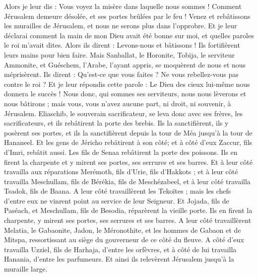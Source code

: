 \begin{multicols}{2}
Alors je leur dis : Vous voyez la misère dans laquelle nous sommes ! Comment Jérusalem demeure désolée, et ses portes brûlées par le feu ! Venez et rebâtissons les murailles de Jérusalem, et nous ne serons plus dans l’opprobre.
Et je leur déclarai comment la main de mon Dieu avait été bonne sur moi, et quelles paroles le roi m'avait dites. Alors ils dirent : Levons-nous et bâtissons ! Ils fortifièrent leurs mains pour bien faire.
Mais Sanballat, le Horonite, Tobija, le serviteur Ammonite, et Guéschem, l’Arabe, l'ayant appris, se moquèrent de nous et nous méprisèrent. Ils dirent : Qu'est-ce que vous faites ? Ne vous rebellez-vous pas contre le roi ?
Et je leur répondis cette parole : Le Dieu des cieux lui-même nous donnera le succès ! Nous donc, qui sommes ses serviteurs, nous nous lèverons et nous bâtirons ; mais vous, vous n'avez aucune part, ni droit, ni souvenir, à Jérusalem.
\VerseOne{}Eliaschib, le souverain sacrificateur, se leva donc avec ses frères, les sacrificateurs, et ils rebâtirent la porte des brebis. Ils la sanctifièrent, ils y posèrent ses portes, et ils la sanctifièrent depuis la tour de Méa jusqu'à la tour de Hananeel.
Et les gens de Jéricho rebâtirent à son côté; et à côté d'eux Zaccur, fils d'Imri, rebâtit aussi.
Les fils de Senaa rebâtirent la porte des poissons. Ils en firent la charpente et y mirent ses portes, ses serrures et ses barres.
Et à leur côté travailla aux réparations Merémoth, fils d'Urie, fils d'Hakkots ; et à leur côté travailla Meschullam, fils de Bérékia, fils de Meschézabeel, et à leur côté travailla Tsadok, fils de Baana.
A leur côté travaillèrent les Tekoïtes ; mais les chefs d'entre eux ne vinrent point au service de leur Seigneur.
Et Jojada, fils de Paséach, et Meschullam, fils de Besodia, réparèrent la vieille porte. Ils en firent la charpente, y mirent ses portes, ses serrures et ses barres.
A leur côté travaillèrent Melatia, le Gabaonite, Jadon, le Méronothite, et les hommes de Gabaon et de Mitspa, ressortissant au siège du gouverneur de ce côté du fleuve.
A côté d’eux travailla Uzziel, fils de Harhaja, d’entre les orfèvres, et à côté de lui travailla Hanania, d'entre les parfumeurs. Et ainsi ils relevèrent Jérusalem jusqu'à la muraille large.

\end{multicols}
